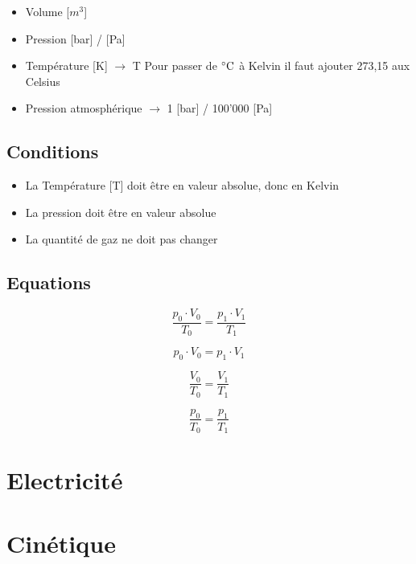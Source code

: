 \documentclass{article}
\begin{document}
\begin{itemize}
  \item Volume [$m^3$]
  \item Pression [bar] / [Pa]
  \item Température [K] $\rightarrow$ T \newline Pour passer de $\celsius$ à Kelvin il faut ajouter 273,15 aux Celsius
  \item Pression atmosphérique $\rightarrow$ 1 [bar] / 100'000 [Pa]
\end{itemize}

\subsection{Conditions}

\begin{itemize}
  \item La Température [T] doit être en valeur absolue, donc en Kelvin
  \item La pression doit être en valeur absolue
  \item La quantité de gaz ne doit pas changer
\end{itemize}

\subsection{Equations}

\begin{equation}
  \frac{p_0 \cdot V_0}{T_0} = \frac{p_1 \cdot V_1}{T_1}
\end{equation}

\begin{equation}
  p_0 \cdot V_0 = p_1 \cdot V_1
\end{equation}

\begin{equation}
  \frac{V_0}{T_0} = \frac{V_1}{T_1}
\end{equation}

\begin{equation}
  \frac{p_0}{T_0} = \frac{p_1}{T_1}
\end{equation}

\pagebreak
\section{Electricité}

\pagebreak
\section{Cinétique}
\end{document}

